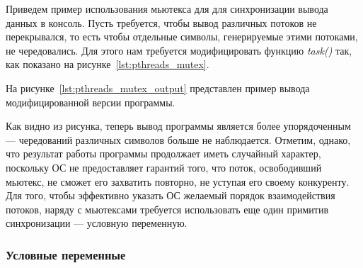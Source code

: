 Приведем пример использования мьютекса для для синхронизации вывода данных в консоль.
Пусть требуется, чтобы вывод различных потоков не перекрывался,
то есть чтобы отдельные символы, генерируемые этими потоками, не чередовались.
Для этого нам требуется модифицировать функцию \textit{task()} так, как показано на
рисунке~\ref{lst:pthreads_mutex}.



На рисунке~\ref{lst:pthreads_mutex_output} представлен пример вывода
модифицированной версии программы.



Как видно из рисунка, теперь вывод программы является более упорядоченным ---
чередований различных символов больше не наблюдается.
Отметим, однако, что результат работы программы продолжает иметь случайный характер,
поскольку ОС не предоставляет гарантий того, что поток, освободивший мьютекс,
не сможет его захватить повторно, не уступая его своему конкуренту.
Для того, чтобы эффективно указать ОС желаемый порядок взаимодействия потоков,
наряду с мьютексами требуется использовать еще один примитив синхронизации ---
условную переменную.

\subsubsection{Условные переменные}

